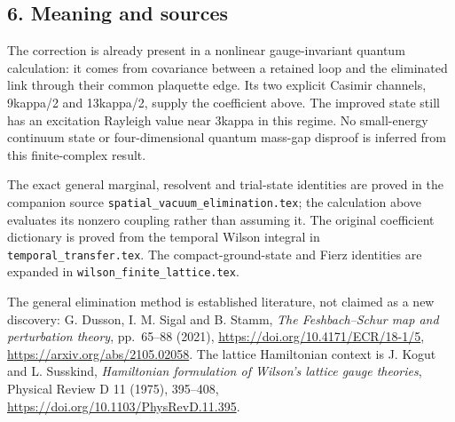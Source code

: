 \documentclass[
  11pt,
]{article}
\begin{document}
\subsection{6. Meaning and sources}\label{meaning-and-sources}

The correction is already present in a nonlinear gauge-invariant quantum
calculation: it comes from covariance between a retained loop and the
eliminated link through their common plaquette edge. Its two explicit
Casimir channels, 9kappa/2 and 13kappa/2, supply the coefficient above.
The improved state still has an excitation Rayleigh value near 3kappa in
this regime. No small-energy continuum state or four-dimensional quantum
mass-gap disproof is inferred from this finite-complex result.

The exact general marginal, resolvent and trial-state identities are
proved in the companion source
\texttt{spatial\_vacuum\_elimination.tex}; the calculation above
evaluates its nonzero coupling rather than assuming it. The original
coefficient dictionary is proved from the temporal Wilson integral in
\texttt{temporal\_transfer.tex}. The compact-ground-state and Fierz
identities are expanded in \texttt{wilson\_finite\_lattice.tex}.

The general elimination method is established literature, not claimed as
a new discovery: G. Dusson, I. M. Sigal and B. Stamm, \emph{The
Feshbach--Schur map and perturbation theory}, pp.~65--88 (2021),
\url{https://doi.org/10.4171/ECR/18-1/5},
\url{https://arxiv.org/abs/2105.02058}. The lattice Hamiltonian context
is J. Kogut and L. Susskind, \emph{Hamiltonian formulation of Wilson's
lattice gauge theories}, Physical Review D 11 (1975), 395--408,
\url{https://doi.org/10.1103/PhysRevD.11.395}.

\clearpage
\appendix

\end{document}
